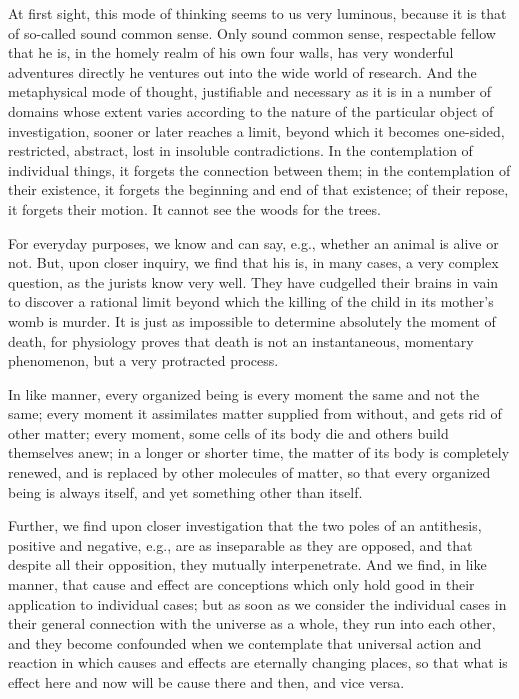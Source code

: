 At first sight, this mode of thinking seems to us very luminous, because it is
that of so-called sound common sense. Only sound common sense, respectable
fellow that he is, in the homely realm of his own four walls, has very wonderful
adventures directly he ventures out into the wide world of research. And the %
metaphysical mode of thought, justifiable and necessary as it is in a number of
domains whose extent varies according to the nature of the particular object of
investigation, sooner or later reaches a limit, beyond which it becomes
one-sided, restricted, abstract, lost in insoluble contradictions. In the
contemplation of individual things, it forgets the connection between them; in
the contemplation of their existence, it forgets the beginning and end of that
existence; of their repose, it forgets their motion. It cannot see the woods for
the trees.

For everyday purposes, we know and can say, e.g., whether an animal is alive or
not. But, upon closer inquiry, we find that his is, in many cases, a very
complex question, as the jurists know very well. They have cudgelled their
brains in vain to discover a rational limit beyond which the killing of the
child in its mother's womb is murder. It is just as impossible to determine
absolutely the moment of death, for physiology proves that death is not an
instantaneous, momentary phenomenon, but a very protracted process.

In like manner, every organized being is every moment the same and not the same;
every moment it assimilates matter supplied from without, and gets rid of other
matter; every moment, some cells of its body die and others build themselves
anew; in a longer or shorter time, the matter of its body is completely renewed,
and is replaced by other molecules of matter, so that every organized being is
always itself, and yet something other than itself.

Further, we find upon closer investigation that the two poles of an antithesis,
positive and negative, e.g., are as inseparable as they are opposed, and that
despite all their opposition, they mutually interpenetrate. And we find, in like
manner, that cause and effect are conceptions which only hold good in their
application to individual cases; but as soon as we consider the individual cases
in their general connection with the universe as a whole, they run into each
other, and they become confounded when we contemplate that universal action and
reaction in which causes and effects are eternally changing places, so that what
is effect here and now will be cause there and then, and vice versa.

